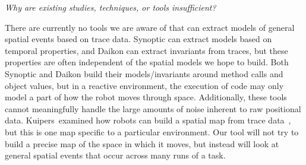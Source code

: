 \emph{Why are existing studies, techniques, or tools insufficient?}

There are currently no tools we are aware of that can extract models of general spatial events based on trace data. 
Synoptic can extract models based on temporal properties, and Daikon can extract invariants from traces, but these properties are often independent of the spatial models we hope to build.
Both Synoptic and Daikon build their models/invariants around method calls and object values, but in a reactive environment, the execution of code may only model a part of how the robot moves through space.
Additionally, these tools cannot meaningfully handle the large amounts of noise inherent to raw positional data.
Kuipers~\etal examined how robots can build a spatial map from trace data~\cite{kuipers1988robust}, but this is one map specific to a particular environment.
Our tool will not try to build a precise map of the space in which it moves, but instead will look at general spatial events that occur across many runs of a task.
